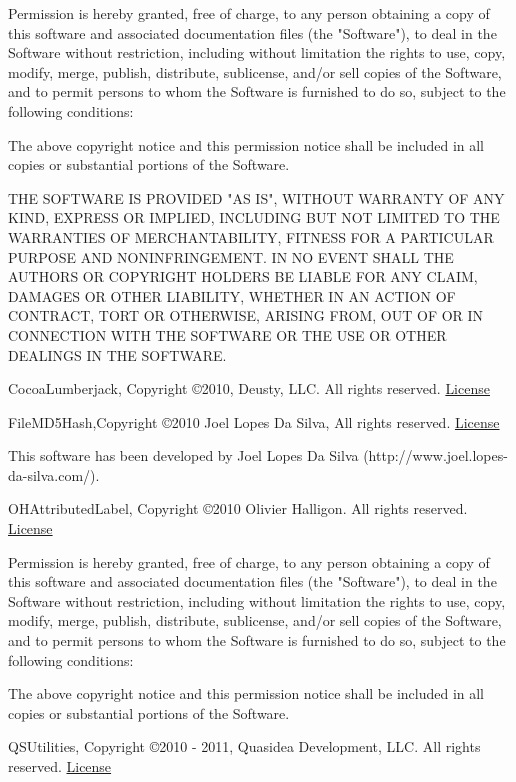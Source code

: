 \documentclass[oneside, openany, 12pt]{tufte-book}
\newcommand{\licensetext}{\scriptsize \setlength{\parskip}{0mm} \singlespacing}
\begin{document}
{\licensetext Permission is hereby granted, free of charge, to any person obtaining a copy of this software and associated documentation files (the "Software"), to deal in the Software without restriction, including without limitation the rights to use, copy, modify, merge, publish, distribute, sublicense, and/or sell copies of the Software, and to permit persons to whom the Software is furnished to do so, subject to the following conditions:

The above copyright notice and this permission notice shall be included in all copies or substantial portions of the Software.

THE SOFTWARE IS PROVIDED "AS IS", WITHOUT WARRANTY OF ANY KIND, EXPRESS OR IMPLIED, INCLUDING BUT NOT LIMITED TO THE WARRANTIES OF MERCHANTABILITY, FITNESS FOR A PARTICULAR PURPOSE AND NONINFRINGEMENT. IN NO EVENT SHALL THE AUTHORS OR COPYRIGHT HOLDERS BE LIABLE FOR ANY CLAIM, DAMAGES OR OTHER LIABILITY, WHETHER IN AN ACTION OF CONTRACT, TORT OR OTHERWISE, ARISING FROM, OUT OF OR IN CONNECTION WITH THE SOFTWARE OR THE USE OR OTHER DEALINGS IN THE SOFTWARE.}

CocoaLumberjack, Copyright \copyright 2010, Deusty, LLC. All rights reserved. \href{https://github.com/robbiehanson/CocoaLumberjack/blob/master/LICENSE.txt}{License}

FileMD5Hash,Copyright \copyright 2010 Joel Lopes Da Silva, All rights reserved. \href{https://github.com/JoeKun/FileMD5Hash/blob/master/LICENSE}{License}

{\licensetext This software has been developed by Joel Lopes Da Silva (http://www.joel.lopes-da-silva.com/).
}


OHAttributedLabel, Copyright \copyright 2010 Olivier Halligon. All rights reserved. \href{https://github.com/AliSoftware/OHAttributedLabel/blob/master/LICENSE}{License}

{\licensetext
Permission is hereby granted, free of charge, to any person obtaining a copy
of this software and associated documentation files (the "Software"), to deal
in the Software without restriction, including without limitation the rights
to use, copy, modify, merge, publish, distribute, sublicense, and/or sell
copies of the Software, and to permit persons to whom the Software is
furnished to do so, subject to the following conditions:

The above copyright notice and this permission notice shall be included in
all copies or substantial portions of the Software.}

QSUtilities, Copyright \copyright 2010 - 2011, Quasidea Development, LLC. All rights reserved. \href{https://github.com/mikeho/QSUtilities/blob/master/LICENSE.txt}{License}
\end{document}
